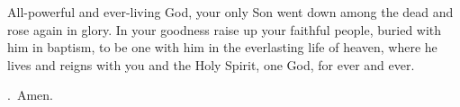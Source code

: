 \lettrine[lines=3]{A}{}ll-powerful and ever-living God,
your only Son went down among the dead
and rose again in glory.
In your goodness
raise up your faithful people,
buried with him in baptism,
to be one with him
in the everlasting life of heaven,
where he lives and reigns with you and the Holy Spirit,
one God, for ever and ever. \par \Rbar.~Amen.
